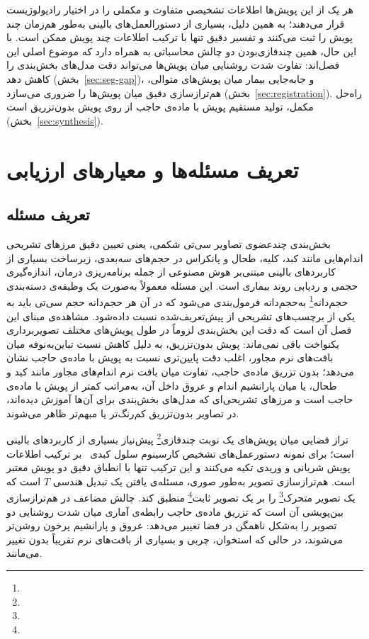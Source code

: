 هر یک از این پویش‌ها اطلاعات تشخیصی متفاوت و مکملی را در اختیار رادیولوژیست قرار می‌دهند؛ به همین دلیل، بسیاری از دستورالعمل‌های بالینی به‌طور هم‌زمان چند پویش را ثبت می‌کنند و تفسیر دقیق تنها با ترکیب اطلاعات چند پویش ممکن است. با این حال، همین چندفازی‌بودن دو چالش محاسباتی به همراه دارد که موضوع اصلی این فصل‌اند: تفاوت شدت روشنایی میان پویش‌ها می‌تواند دقت مدل‌های بخش‌بندی را کاهش دهد (بخش~\ref{sec:seg-gap})، و جابه‌جایی بیمار میان پویش‌های متوالی، هم‌ترازسازی دقیق میان پویش‌ها را ضروری می‌سازد (بخش~\ref{sec:registration}). راه‌حل مکمل، تولید مستقیم پویش با ماده‌ی حاجب از روی پویش بدون‌تزریق است (بخش~\ref{sec:synthesis}).

\section{تعریف مسئله‌ها و معیارهای ارزیابی}
\label{sec:lit-problems}

\subsection*{تعریف مسئله}


بخش‌بندی چندعضوی تصاویر سی‌تی شکمی، یعنی تعیین دقیق مرزهای تشریحی اندام‌هایی مانند کبد، کلیه، طحال و پانکراس در حجم‌های سه‌بعدی، زیرساخت بسیاری از کاربردهای بالینی مبتنی‌بر هوش مصنوعی از جمله برنامه‌ریزی درمان، اندازه‌گیری حجمی و ردیابی روند بیماری است. این مسئله معمولاً به‌صورت یک وظیفه‌ی دسته‌بندی حجم‌دانه‌\footnote{} به‌حجم‌دانه فرمول‌بندی می‌شود که در آن هر حجم‌دانه حجم سی‌تی باید به یکی از برچسب‌های تشریحی از پیش‌تعریف‌شده نسبت داده‌شود. مشاهده‌ی مبنای این فصل آن است که دقت این بخش‌بندی لزوماً در طول پویش‌های مختلف تصویربرداری یکنواخت باقی نمی‌ماند: پویش بدون‌تزریق، به دلیل کاهش نسبت تباین‌به‌نوفه میان بافت‌های نرم مجاور، اغلب دقت پایین‌تری نسبت به پویش با ماده‌ی حاجب نشان می‌دهد؛ بدون تزریق ماده‌ی حاجب، تفاوت میان بافت نرم اندام‌های مجاور مانند کبد و طحال، یا میان پارانشیم اندام و عروق داخل آن، به‌مراتب کمتر از پویش با ماده‌ی حاجب است و مرزهای تشریحی‌ای که مدل‌های بخش‌بندی برای آن‌ها آموزش دیده‌اند، در تصاویر بدون‌تزریق کم‌رنگ‌تر یا مبهم‌تر ظاهر می‌شوند.

تراز فضایی میان پویش‌های یک نوبت چندفازی\footnote{} پیش‌نیاز بسیاری از کاربردهای بالینی است؛ برای نمونه دستورعمل‌های تشخیص کارسینوم سلول کبدی~\cite{easl2018,forner2018} بر ترکیب اطلاعات پویش شریانی و وریدی تکیه می‌کنند و این ترکیب تنها با انطباق دقیق دو پویش معتبر است. هم‌ترازسازی تصویر به‌طور صوری، مسئله‌ی یافتن یک تبدیل هندسی $T$ است که یک تصویر متحرک\footnote{} را بر یک تصویر ثابت\footnote{} منطبق کند. چالش مضاعف در هم‌ترازسازی بین‌پویشی آن است که تزریق ماده‌ی حاجب رابطه‌ی آماری میان شدت روشنایی دو تصویر را به‌شکل ناهمگن در فضا تغییر می‌دهد: عروق و پارانشیم پرخون روشن‌تر می‌شوند، در حالی که استخوان، چربی و بسیاری از بافت‌های نرم تقریباً بدون تغییر می‌مانند.

